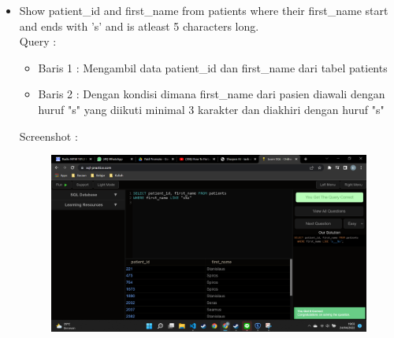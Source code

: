 \documentclass[]{article}
\begin{document}
\begin{itemize}
        \item Show patient\_id and first\_name from patients where their first\_name start and ends with 's' and is atleast 5 characters long.
        \\Query :
        
        \begin{itemize}
            \item Baris 1 : Mengambil data patient\_id dan first\_name dari tabel patients
            \item Baris 2 : Dengan kondisi dimana first\_name dari pasien diawali dengan huruf "s" yang diikuti minimal 3 karakter dan diakhiri dengan huruf "s" 
        \end{itemize}
        \pagebreak
        Screenshot :
        \begin{figure}[h]
            \includegraphics[scale=0.3]{./Screenshot/Medium-3.png}
            \centering
        \end{figure}


\end{itemize}
\end{document}
